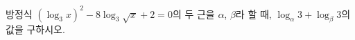 방정식 $(\log_3 x)^2-8\log_3 \sqrt{x}+2=0$의 두 근을 $\alpha$, $\beta$라 할 때, $\log_\alpha 3+\log_\beta 3$의 값을 구하시오.

